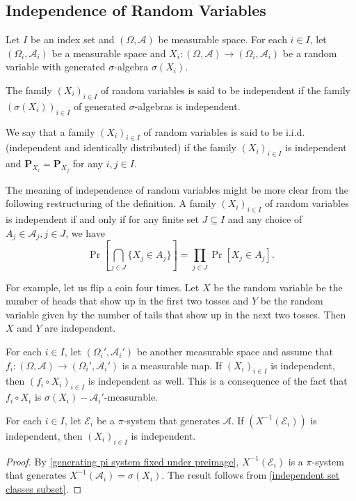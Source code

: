 \subsection{Independence of Random Variables}

Let $I$ be an index set and $(\Omega,\mathcal{A})$ be measurable space. For each $i\in I$, let $(\Omega_i,\mathcal{A}_i)$ be a measurable space and $X_i:(\Omega,\mathcal{A})\to(\Omega_i,\mathcal{A}_i)$ be a random variable with generated $\sigma$-algebra $\sigma(X_i)$.

\begin{definition}
    The family $(X_i)_{i\in I}$ of random variables is said to be independent if the family $(\sigma(X_i))_{i\in I}$ of generated $\sigma$-algebras is independent.
\end{definition}

We say that a family $(X_i)_{i\in I}$ of random variables is said to be i.i.d. (independent and identically distributed) if the family $(X_i)_{i\in I}$ is independent and $\textbf{P}_{X_i}=\textbf{P}_{X_j}$ for any $i,j\in I$.

\vspace{2mm}
The meaning of independence of random variables might be more clear from the following restructuring of the definition. A family $(X_i)_{i\in I}$ of random variables is independent if and only if for any finite set $J\subseteq I$ and any choice of $A_j\in\mathcal{A}_j,j\in J$, we have
$$\Pr\left[\bigcap_{j\in J}\{X_j\in A_j\}\right] = \prod_{j\in J}\Pr[X_j\in A_j].$$

\vspace{1mm}
For example, let us flip a coin four times. Let $X$ be the random variable be the number of heads that show up in the first two tosses and $Y$ be the random variable given by the number of tails that show up in the next two tosses. Then $X$ and $Y$ are independent.

\vspace{2mm}
For each $i\in I$, let $(\Omega_i',\mathcal{A}_i')$ be another measurable space and assume that $f_i:(\Omega,\mathcal{A})\to(\Omega_i',\mathcal{A}_i')$ is a measurable map. If $(X_i)_{i\in I}$ is independent, then $(f_i\circ X_i)_{i\in I}$ is independent as well. This is a consequence of the fact that $f_i\circ X_i$ is $\sigma(X_i)-\mathcal{A}_i'$-measurable.

\begin{theorem}
\label{independent if generators independent}
    For each $i\in I$, let $\mathcal{E}_i$ be a $\pi$-system that generates $\mathcal{A}$. If $(X^{-1}(\mathcal{E}_i))$ is independent, then $(X_i)_{i\in I}$ is independent.
\end{theorem}
\begin{proof}
    By \cref{generating pi system fixed under preimage}, $X^{-1}(\mathcal{E}_i)$ is a $\pi$-system that generates $X^{-1}(\mathcal{A}_i)=\sigma(X_i)$. The result follows from \cref{independent set classes subset}.
\end{proof}

